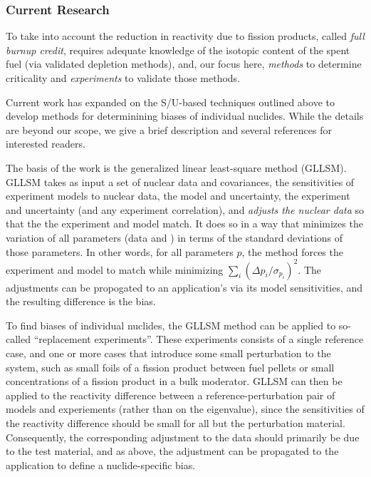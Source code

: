 \subsubsection*{Current Research}

To take into account the reduction in reactivity due to fission products,
called \textit{full burnup credit}, requires adequate knowledge of the 
isotopic content of the spent fuel (via validated depletion methods), and, 
our focus here, \textit{methods} to determine criticality and 
\textit{experiments} to validate those methods.

Current work has expanded on the S/U-based techniques
outlined above to develop methods for determinining biases of 
individual nuclides. While the details are beyond our scope, we give 
a brief description and several references for interested readers.

The basis of the work is the generalized linear least-square method (GLLSM).
GLLSM takes as input a set of nuclear data and covariances, the sensitivities 
of experiment models to nuclear data, the model \keff and uncertainty,
the experiment \keff and uncertainty (and any experiment correlation), 
and \textit{adjusts the nuclear data}
so that the the experiment and model \keff match.  It does so in a way that
minimizes the variation of all parameters (data and \keff) in terms of the
standard deviations of those parameters.  In other words, for all parameters
$p$, the method forces the experiment and model \keff to match while 
minimizing $\sum_i (\Delta p_i / \sigma_{p_i})^2$.  The adjustments can be 
propogated to an application's \keff via its model sensitivities, and the 
resulting difference is the bias.

To find biases of individual nuclides, the GLLSM method can be applied to 
so-called ``replacement experiments''.  These experiments consists of a single
reference case, and one or more cases that introduce some small perturbation
to the system, such as small foils of a fission product between fuel pellets 
 or small concentrations of a fission product in a bulk
moderator.  GLLSM can then be applied to the reactivity 
difference between a reference-perturbation pair of models and experiements 
(rather than on the eigenvalue), since the sensitivities of the 
reactivity difference should be small for all but the perturbation 
material.  Consequently, the corresponding adjustment to the data should 
primarily be due to the test material, and as above, the adjustment can 
be propagated to the application to define a nuclide-specific bias.

